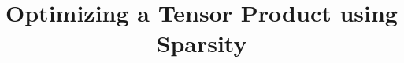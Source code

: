 \documentclass[conference]{IEEEtran}
\begin{document}
\title{Optimizing a Tensor Product using Sparsity}

\author{
\and
{}
\and
{}
}

\maketitle

\begin{abstract}

\end{abstract}








\end{document}
